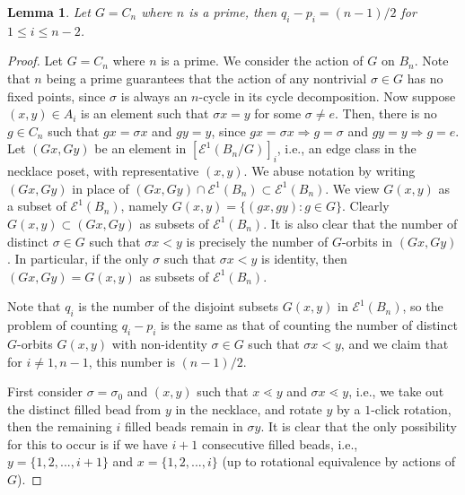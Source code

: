 \documentclass[10 pt]{amsart}
\theoremstyle{plain}
\newtheorem{lem}[thm]{Lemma}
\theoremstyle{definition}
\theoremstyle{remark}
\numberwithin{equation}{section}
\newcommand{\so}{\Rightarrow}
\begin{document}
\begin{lem}{\label{lem:cyclicprime}}
Let $G = C_n$ where $n$ is a prime, then $q_i - p_i = (n-1)/2$ for $ 1 \le i \le n-2$. 
\end{lem}

\begin{proof} 
Let $G = C_n$ where $n$ is a prime. We consider the action of $G$ on $B_n$. 
 Note that $n$ being a prime guarantees that the action of any nontrivial $\sigma \in G$ has no fixed points, since $\sigma$ is always an $n$-cycle in its cycle decomposition. Now suppose $(x, y) \in A_i$   is an element such that $\sigma x =y$ for some $\sigma \neq e$. Then, there is no $g \in C_n$ such that $gx = \sigma x$ and $g y = y$, since $gx = \sigma x \so g = \sigma $ and $g y = y \so g = e$. Let $(Gx, Gy)$  be an element in $[\mathcal E^1(B_n/G)]_i$, i.e., an edge class in the necklace poset, with representative $(x, y)$. We abuse notation by writing $(Gx, Gy)$ in place of $(Gx, Gy) \cap \mathcal E^1(B_n) \subset \mathcal E^1(B_n)$. We view $G(x , y)$ as a subset of $\mathcal E^1 (B_n)$, namely $G(x, y) = \{(gx, g y) : g \in G \}$. Clearly $G(x , y) \subset (Gx,Gy)$ as subsets of $\mathcal E^1 (B_n)$. It is also clear that the number of distinct $\sigma \in G$ such that $\sigma x < y$ is precisely the number of $G$-orbits in $(Gx, Gy)$. In particular, if the only $\sigma $ such that $\sigma x < y$ is identity, then $(Gx, Gy)=G(x, y)$ as subsets of $\mathcal E^1 (B_n)$. 

Note that $q_i$ is the number of the disjoint subsets $G(x, y)$ in $\mathcal E^1 (B_n)$, so the problem of counting $q_i - p_i$ is the same as that of counting the number of distinct $G$-orbits $G(x , y)$  with non-identity $\sigma \in G$ such that $\sigma x < y$, and we claim that for $i\neq 1,n-1$, this number is $(n-1)/2$. 


First consider $\sigma = \sigma_0$ and $(x,y)$ such that $x \lessdot y$ and $\sigma x \lessdot y$, i.e., we take out the distinct filled bead from $y$ in the necklace, and rotate $y$ by a $1$-click rotation, then the remaining $i$ filled beads remain in $\sigma y$.  It is clear that the only possibility for this to occur is if we have $i+1$ consecutive filled beads, i.e., $y = \{1, 2, ..., i+1\}$ and $x = \{1, 2, ..., i \}$ (up to rotational equivalence by actions of $G$). 


\end{proof}
\end{document}
